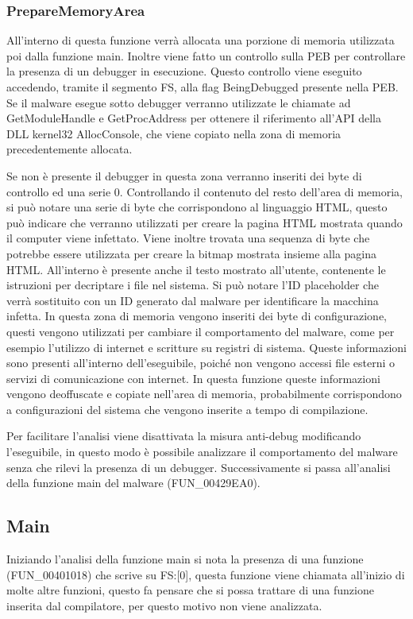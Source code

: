 \documentclass[a4paper,12pt]{article}
\begin{document}
\subsubsection{PrepareMemoryArea}
All'interno di questa funzione verrà allocata una porzione di memoria utilizzata poi dalla funzione main. Inoltre viene fatto un controllo sulla PEB per controllare la presenza di un debugger in esecuzione. Questo controllo viene eseguito accedendo, tramite il segmento FS, alla flag BeingDebugged presente nella PEB. Se il malware esegue sotto debugger verranno utilizzate le chiamate ad GetModuleHandle e GetProcAddress per ottenere il riferimento all'API della DLL kernel32 AllocConsole, che viene copiato nella zona di memoria precedentemente allocata. 

Se non è presente il debugger in questa zona verranno inseriti dei byte di controllo ed una serie 0. Controllando il contenuto del resto dell'area di memoria, si può notare una serie di byte che corrispondono al linguaggio HTML, questo può indicare che verranno utilizzati per creare la pagina HTML mostrata quando il computer viene infettato. Viene inoltre trovata una sequenza di byte che potrebbe essere utilizzata per creare la bitmap mostrata insieme alla pagina HTML. All'interno è presente anche il testo mostrato all'utente, contenente le istruzioni per decriptare i file nel sistema. Si può notare l'ID placeholder che verrà sostituito con un ID generato dal malware per identificare la macchina infetta. 
In questa zona di memoria vengono inseriti dei byte di configurazione, questi vengono utilizzati per cambiare il comportamento del malware, come per esempio l'utilizzo di internet e scritture su registri di sistema.  Queste informazioni sono presenti all'interno dell'eseguibile, poiché non vengono accessi file esterni o servizi di comunicazione con internet. In questa funzione queste informazioni vengono deoffuscate e copiate nell'area di memoria, probabilmente corrispondono a configurazioni del sistema che vengono inserite a tempo di compilazione. 

Per facilitare l'analisi viene disattivata la misura anti-debug modificando l'eseguibile, in questo modo è possibile analizzare il comportamento del malware senza che rilevi la presenza di un debugger. 
Successivamente si passa all'analisi della funzione main del malware (FUN\_00429EA0).

\subsection{Main}
Iniziando l'analisi della funzione main si nota la presenza di una funzione (FUN\_00401018) che scrive su FS:[0], questa funzione viene chiamata all'inizio di molte altre funzioni, questo fa pensare che si possa trattare di una funzione inserita dal compilatore, per questo motivo non viene analizzata.
\end{document}
